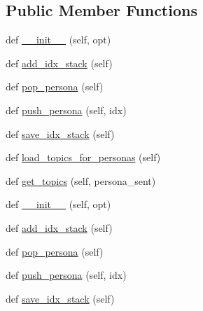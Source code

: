 \subsection*{Public Member Functions}
\begin{DoxyCompactItemize}
\item 
def \hyperlink{classworlds_1_1PersonasGenerator_a8de0721e02fce900b4f3c15f6cf0e2e1}{\+\_\+\+\_\+init\+\_\+\+\_\+} (self, opt)
\item 
def \hyperlink{classworlds_1_1PersonasGenerator_a2eecaa6079fea0384e1e8538991196e9}{add\+\_\+idx\+\_\+stack} (self)
\item 
def \hyperlink{classworlds_1_1PersonasGenerator_ada6f80abe6e9881a2ac225015531788c}{pop\+\_\+persona} (self)
\item 
def \hyperlink{classworlds_1_1PersonasGenerator_acc8e5aeffdb815f8ca89af167cf8062e}{push\+\_\+persona} (self, idx)
\item 
def \hyperlink{classworlds_1_1PersonasGenerator_a5a71b02bc024659c63d0f5416de64fe8}{save\+\_\+idx\+\_\+stack} (self)
\item 
def \hyperlink{classworlds_1_1PersonasGenerator_ac173abbfcad290ac88c504aea581c522}{load\+\_\+topics\+\_\+for\+\_\+personas} (self)
\item 
def \hyperlink{classworlds_1_1PersonasGenerator_a79c3dfc6c9967fb2733350352d78c0c0}{get\+\_\+topics} (self, persona\+\_\+sent)
\item 
def \hyperlink{classworlds_1_1PersonasGenerator_a8de0721e02fce900b4f3c15f6cf0e2e1}{\+\_\+\+\_\+init\+\_\+\+\_\+} (self, opt)
\item 
def \hyperlink{classworlds_1_1PersonasGenerator_a2eecaa6079fea0384e1e8538991196e9}{add\+\_\+idx\+\_\+stack} (self)
\item 
def \hyperlink{classworlds_1_1PersonasGenerator_ada6f80abe6e9881a2ac225015531788c}{pop\+\_\+persona} (self)
\item 
def \hyperlink{classworlds_1_1PersonasGenerator_acc8e5aeffdb815f8ca89af167cf8062e}{push\+\_\+persona} (self, idx)
\item 
def \hyperlink{classworlds_1_1PersonasGenerator_a5a71b02bc024659c63d0f5416de64fe8}{save\+\_\+idx\+\_\+stack} (self)
\end{DoxyCompactItemize}
